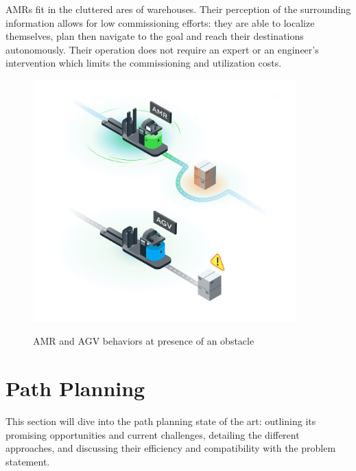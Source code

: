AMRs fit in the cluttered ares of warehouses. Their perception of the surrounding information allows for
low commissioning efforts: they are able to localize themselves, plan then navigate to the goal and reach their 
destinations autonomously. Their operation does not require an expert or an engineer's intervention which 
limits the commissioning and utilization costs.

\begin{figure}[H]
    \begin{center}
       \includegraphics[width=4in]{images/Chap1/AMR-VS-AGV.png}\\
       \caption{AMR and AGV behaviors at presence of an obstacle \cite{R9}}
       \label{AMR-VS-AGV}
       \end{center}
\end{figure}


\section{Path Planning}
This section will dive into the path planning state of the art: outlining its promising 
opportunities and current challenges, detailing the different approaches, and discussing
their efficiency and compatibility with the problem statement.

